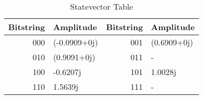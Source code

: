 \begin{table}[H]
\centering
\caption{Statevector Table}
\label{tab:sv_for_PTDF}
\begin{tabular}{@{}rlrl@{}}
\toprule
Bitstring & {Amplitude} & Bitstring & {Amplitude} \\
\midrule
000 & (-0.0909+0j) & 001 & (0.6909+0j) \\
010 & (0.9091+0j) & 011 & {-} \\
100 & -0.6207j & 101 & 1.0028j \\
110 & 1.5639j & 111 & {-} \\
\bottomrule
\end{tabular}\end{table}